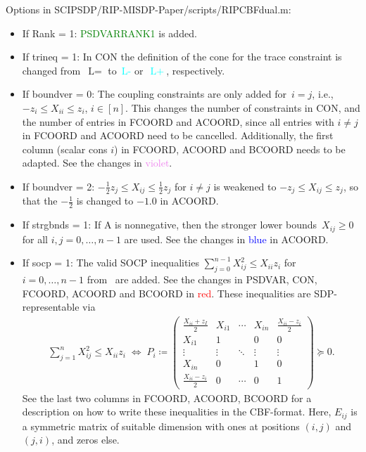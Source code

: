 \documentclass[11pt,a4paper]{article}
\newcommand{\define}{\coloneqq}
\theoremstyle{definition}
\begin{document}
Options in \textsf{SCIPSDP/RIP-MISDP-Paper/scripts/RIPCBFdual.m}:
\begin{itemize}
\item If Rank = 1: \textcolor{green}{PSDVARRANK1} is added.
\item If trineq = 1: In CON the definition of the cone for the trace
  constraint is changed from~$\text{L}=$ to~\textcolor{cyan}{$\text{L-}$}
  or~\textcolor{cyan}{$\text{L}+$}, respectively.
\item If boundver = 0: The coupling constraints are only added for~$i = j$,
  i.e., {\color{violet} $-z_i \leq X_{ii} \leq z_i$, $i \in [n]$}. This
  changes the number of constraints in CON, and the number of entries in
  FCOORD and ACOORD, since all entries with $i \neq j$ in FCOORD and ACOORD
  need to be cancelled. Additionally, the first column (scalar cons $i$) in
  FCOORD, ACOORD and BCOORD needs to be adapted. See the changes in
  \textcolor{violet}{violet}.
\item If boundver = 2: {\color{orange}
    $-\tfrac{1}{2}z_j \leq X_{ij} \leq \tfrac{1}{2}z_j$ for $i \neq j$} is
  weakened to {\color{orange}$-z_j \leq X_{ij} \leq z_j$}, so that the
  {\color{orange} $-\tfrac{1}{2}$} is changed to $-1.0$ in ACOORD.
\item If strgbnds = 1: If A is nonnegative, then the stronger lower
  bounds~$X_{ij} \geq 0$ for all $i,j =0,\dots,n-1$ are used. See the
  changes in \textcolor{blue}{blue} in ACOORD.
\item If socp = 1: The valid SOCP inequalities
  $\sum_{j=0}^{n-1}X_{ij}^2 \leq X_{ii}z_i$ for $i = 0,\dots,n-1$
  from~\cite{LiX20} are added. See the changes in PSDVAR, CON, FCOORD,
  ACOORD and BCOORD in \textcolor{red}{red}. These inequalities are
  SDP-representable via
  \begin{align*}
    \sum_{j=1}^n X_{ij}^2 \leq X_{ii}z_i \; \Leftrightarrow \;
    P_i \define \begin{pmatrix}
      \tfrac{X_{ii}+z_I}{2} & X_{i1} & \cdots & X_{in} & \tfrac{X_{ii}-z_i}{2}
      \\
      X_{i1} & 1 & & 0 & 0 \\
      \vdots &\vdots & \ddots & \vdots & \vdots \\
      X_{in} & 0 & & 1 & 0 \\
      \tfrac{X_{ii}-z_i}{2} & 0 & \cdots & 0 & 1
    \end{pmatrix} \succeq 0.
  \end{align*}
  See the last two columns in FCOORD, ACOORD, BCOORD for a description on
  how to write these inequalities in the CBF-format. Here, $E_{ij}$ is a
  symmetric matrix of suitable dimension with ones at positions $(i,j)$ and
  $(j,i)$, and zeros else.
\end{itemize}

\begin{small}
  
  
\end{small}
\end{document}
